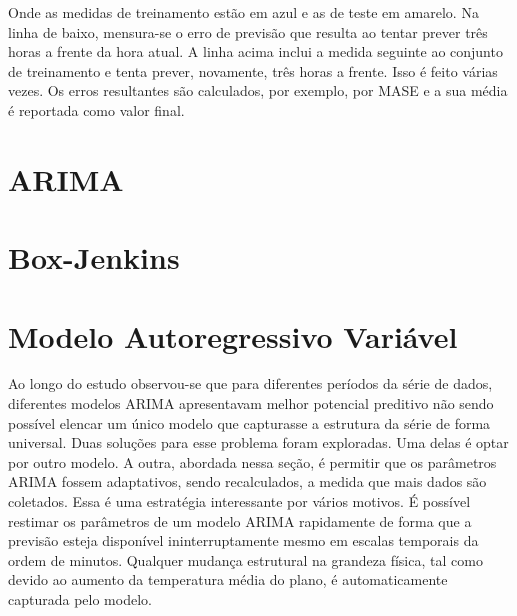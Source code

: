 \documentclass[
	12pt,				%
	openright,			%
	oneside,			%
	a4paper,			%
	english,			%
	french,				%
	spanish,			%
	brazil				%
	]{abntex2}
\begin{document}
Onde as medidas de treinamento estão em azul e as de teste em amarelo. Na linha de baixo, mensura-se o erro de previsão que resulta ao tentar prever três horas a frente da hora atual. A linha acima inclui a medida seguinte ao conjunto de treinamento e tenta prever, novamente, três horas a frente. Isso é feito várias vezes. Os erros resultantes são calculados, por exemplo, por MASE e a sua média é reportada como valor final.

\section{ARIMA}



\section{Box-Jenkins}

%

\section{Modelo Autoregressivo Variável}

Ao longo do estudo observou-se que para diferentes períodos da série de dados, diferentes modelos ARIMA apresentavam melhor potencial preditivo não sendo possível elencar um único modelo que capturasse a estrutura da série de forma universal. Duas soluções para esse problema foram exploradas. Uma delas é optar por outro modelo. A outra, abordada nessa seção, é permitir que os parâmetros ARIMA fossem adaptativos, sendo recalculados, a medida que mais dados são coletados.
Essa é uma estratégia interessante por vários motivos. É possível restimar os parâmetros de um modelo ARIMA rapidamente de forma que a previsão esteja disponível ininterruptamente mesmo em escalas temporais da ordem de minutos. Qualquer mudança estrutural na grandeza física, tal como devido ao aumento da temperatura média do plano, é automaticamente capturada pelo modelo.
\end{document}
